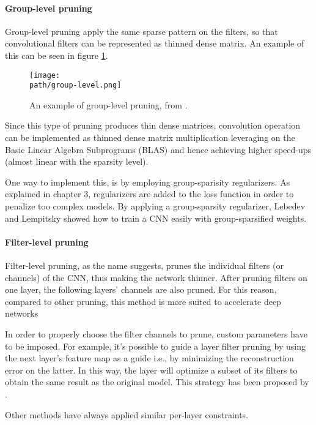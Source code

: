 \paragraph{Group-level pruning}
Group-level pruning apply the same sparse pattern on the filters, so that convolutional filters can be represented as thinned dense matrix. An example of this can be seen in figure \ref{fig:group-pruning}.

\begin{figure}[h!]
 \centering
 \texttt{[image: \\path/group-level.png]} 
 \caption{An example of group-level pruning, from  \parencite{survey2018}.}
 \label{fig:group-pruning}
\end{figure}

Since this type of pruning produces thin dense matrices, convolution operation can be implemented as thinned dense matrix multiplication leveraging on the Basic Linear Algebra Subprograms (BLAS) and hence achieving higher speed-ups (almost linear with the sparsity level). 

One way to implement this, is by employing group-sparisity regularizers. As explained in chapter 3, regularizers are added to the loss function in order to penalize too complex models. By applying a group-sparsity regularizer, Lebedev and Lempitsky \parencite{lebedev2} showed how to train a CNN easily with group-sparsified weights. 


\paragraph{Filter-level pruning}
Filter-level pruning, as the name suggests, prunes the individual filters (or channels) of the CNN, thus making the network thinner. After pruning filters on one layer, the following layers' channels are also pruned. For this reason, compared to other pruning, this method is more suited to accelerate deep networks 
\newline 

In order to properly choose the filter channels to prune, custom parameters have to be imposed. For example, it's possible to guide a layer filter pruning by using the next layer's feature map as a guide i.e., by minimizing the reconstruction error on the latter. In this way, the layer will optimize a subset of its filters to obtain the same result as the original model. This strategy has been proposed by \parencite{Luo2017}. 
\newline

Other methods have always applied similar per-layer constraints. 


